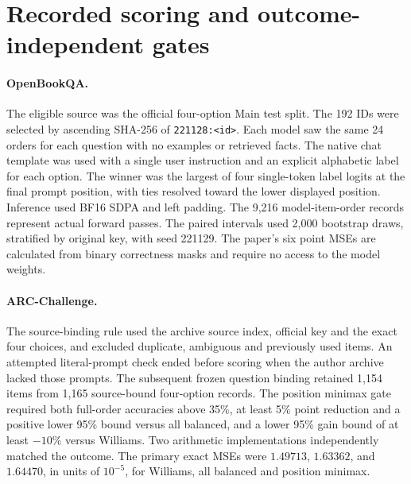 \section{Recorded scoring and outcome-independent gates}
\label{app:protocol}

\paragraph{OpenBookQA.}
The eligible source was the official four-option Main test split. The
192 IDs were selected by ascending SHA-256 of \texttt{221128:<id>}.
Each model saw the same 24 orders for each question with no examples
or retrieved facts. The native chat template was used with a single user
instruction and an explicit alphabetic label for each option. The
winner was the largest of four single-token label logits at the final
prompt position, with ties resolved toward the lower displayed position.
Inference used BF16 SDPA and left padding. The 9,216 model-item-order
records represent actual forward passes. The paired intervals used
2,000 bootstrap draws, stratified by original key, with seed 221129.
The paper's six point MSEs are calculated from binary correctness masks
and require no access to the model weights.

\paragraph{ARC-Challenge.}
The source-binding rule used the archive source index, official key and
the exact four choices, and excluded duplicate, ambiguous and previously
used items. An attempted literal-prompt check ended before scoring when
the author archive lacked those prompts. The subsequent frozen question
binding retained 1,154 items from 1,165 source-bound four-option records.
The position minimax gate required both full-order accuracies above 35\%,
at least 5\% point reduction and a positive lower 95\% bound versus all
balanced, and a lower 95\% gain bound of at least \(-10\%\) versus Williams.
Two arithmetic implementations independently matched the outcome.
The primary exact MSEs were \(1.49713\), \(1.63362\), and \(1.64470\),
in units of \(10^{-5}\), for Williams, all balanced and position minimax.

